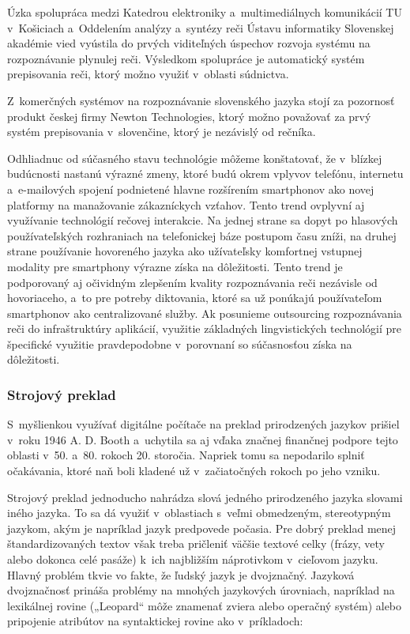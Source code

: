 \begin{multicols}{2}
Úzka spolupráca medzi Katedrou elektroniky a~multimediálnych komunikácií TU v~Košiciach a~Oddelením analýzy a~syntézy reči Ústavu informatiky Slovenskej akadémie vied vyústila do prvých viditeľných úspechov rozvoja systému na rozpoznávanie plynulej reči. Výsledkom spolupráce je automatický systém prepisovania reči, ktorý možno využiť v~oblasti súdnictva.

Z~komerčných systémov na rozpoznávanie slovenského jazyka stojí za pozornosť produkt českej firmy Newton Technologies, ktorý možno považovať za prvý systém prepisovania v~slovenčine, ktorý je nezávislý od rečníka.

Odhliadnuc od súčasného stavu technológie môžeme konštatovať, že v~blízkej budúcnosti nastanú výrazné zmeny, ktoré budú okrem vplyvov telefónu, internetu a~e-mailových spojení podnietené hlavne rozšírením smartphonov ako novej platformy na manažovanie zákazníckych vzťahov. Tento trend ovplyvní aj využívanie technológií rečovej interakcie. Na jednej strane sa dopyt po hlasových používateľských rozhraniach na telefonickej báze postupom času zníži, na druhej strane používanie hovoreného jazyka ako užívateľsky komfortnej vstupnej modality pre smartphony výrazne získa na dôležitosti. Tento trend je podporovaný aj očividným zlepšením kvality rozpoznávania reči nezávisle od hovoriaceho, a~to pre potreby diktovania, ktoré sa už ponúkajú používateľom smartphonov ako centralizované služby. Ak posunieme outsourcing rozpoznávania reči do infraštruktúry aplikácií, využitie základných lingvistických technológií pre špecifické využitie pravdepodobne v~porovnaní so súčasnosťou získa na dôležitosti.  

\subsubsection{Strojový preklad}
S~myšlienkou využívať digitálne počítače na preklad
prirodzených jazykov prišiel v~roku 1946 A. D. Booth a~uchytila sa aj
vďaka značnej finančnej podpore tejto oblasti v~50. a~80. rokoch 20.
storočia. Napriek tomu sa  nepodarilo
splniť očakávania, ktoré naň boli kladené už v~začiatočných
rokoch po jeho vzniku.

Strojový preklad jednoducho nahrádza slová jedného prirodzeného
jazyka slovami iného jazyka. To sa dá využiť v~oblastiach s~veľmi
obmedzeným, stereotypným jazykom, akým je napríklad jazyk predpovede
počasia. Pre dobrý preklad menej štandardizovaných textov však
treba pričleniť väčšie textové celky (frázy, vety alebo dokonca
celé pasáže) k~ich najbližším náprotivkom v~cieľovom jazyku.
Hlavný problém tkvie vo fakte, že ľudský jazyk je dvojznačný.
Jazyková dvojznačnosť prináša problémy na mnohých jazykových
úrovniach, napríklad  na
lexikálnej rovine („Leopard“ môže znamenať zviera alebo
operačný systém) alebo pripojenie atribútov na syntaktickej rovine
ako v~príkladoch:


\end{multicols}
